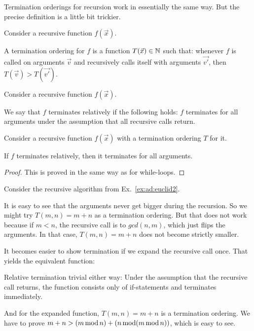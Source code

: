 Termination orderings for recursion work in essentially the same way.
But the precise definition is a little bit trickier.

\begin{definition}\label{sec:def:termord:rec}
Consider a recursive function $f(\vec{x})$.

A termination ordering for $f$ is a function $T(\vec{x})\in\mathbb{N}$ such that: whenever $f$ is called on arguments $\vec{v}$ and recursively calls itself with arguments $\vec{v'}$, then $T(\vec{v})>T(\vec{v'})$.
\end{definition}

\begin{definition}\label{sec:def:termord:relterm}
Consider a recursive function $f(\vec{x})$.

We say that $f$ terminates relatively if the following holds: $f$ terminates for all arguments under the assumption that all recursive calls return.
\end{definition}

\begin{theorem}\label{sec:thm:termord:rec}
Consider a recursive function $f(\vec{x})$ with a termination ordering $T$ for it.

If $f$ terminates relatively, then it terminates for all arguments.
\end{theorem}
\begin{proof}
This is proved in the same way as for while-loops.
\end{proof}

\begin{example}
Consider the recursive algorithm from Ex.~\ref{ex:ad:euclid2}.

It is easy to see that the arguments never get bigger during the recursion.
So we might try $T(m,n)=m+n$ as a termination ordering.
But that does not work because if $m<n$, the recursive call is to $gcd(n,m)$, which just flips the arguments.
In that case, $T(m,n)=m+n$ does not become strictly smaller.

It becomes easier to show termination if we expand the recursive call once.
That yields the equivalent function:
\begin{acode}
\end{acode}

Relative termination trivial either way: Under the assumption that the recursive call returns, the function consists only of if-statements and terminates immediately.

And for the expanded function, $T(m,n)=m+n$ is a termination ordering.
We have to prove $m+n>(m\mathop{\mathrm{mod}} n)+(n\mathop{\mathrm{mod}}(m\mathop{\mathrm{mod}} n))$, which is easy to see.
\end{example}

